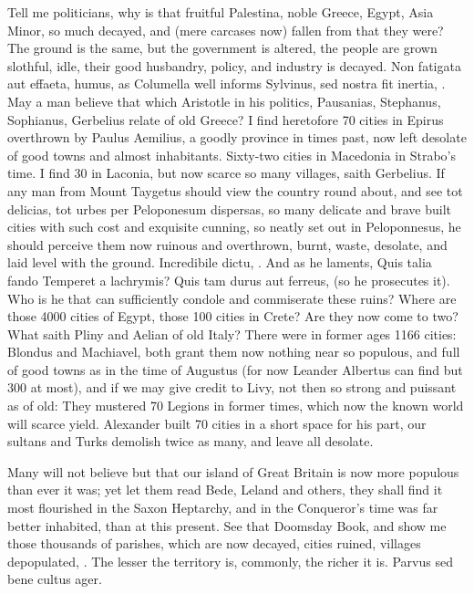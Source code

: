 {Tell me politicians, why is that fruitful Palestina, noble Greece,
Egypt, Asia Minor, so much decayed, and (mere carcases now) fallen from
that they were? The ground is the same, but the government is altered,
the people are grown slothful, idle, their good husbandry, policy, and
industry is decayed. Non fatigata aut effaeta, humus, as Columella
well informs Sylvinus, sed nostra fit inertia, \etc{}. May a man believe
that which Aristotle in his politics, Pausanias, Stephanus, Sophianus,
Gerbelius relate of old Greece? I find heretofore 70 cities in Epirus
overthrown by Paulus Aemilius, a goodly province in times past,
now left desolate of good towns and almost inhabitants. Sixty-two
cities in Macedonia in Strabo's time. I find 30 in Laconia, but now
scarce so many villages, saith Gerbelius. If any man from Mount
Taygetus should view the country round about, and see tot delicias, tot
urbes per Peloponesum dispersas, so many delicate and brave built
cities with such cost and exquisite cunning, so neatly set out in
Peloponnesus, he should perceive them now ruinous and overthrown,
burnt, waste, desolate, and laid level with the ground. Incredibile
dictu, \etc{}. And as he laments, Quis talia fando Temperet a lachrymis?
Quis tam durus aut ferreus, (so he prosecutes it). Who is he that
can sufficiently condole and commiserate these ruins? Where are those
4000 cities of Egypt, those 100 cities in Crete? Are they now come to
two? What saith Pliny and Aelian of old Italy? There were in former
ages 1166 cities: Blondus and Machiavel, both grant them now nothing
near so populous, and full of good towns as in the time of Augustus
(for now Leander Albertus can find but 300 at most), and if we may give
credit to Livy, not then so strong and puissant as of old: They
mustered 70 Legions in former times, which now the known world will
scarce yield. Alexander built 70 cities in a short space for his part,
our sultans and Turks demolish twice as many, and leave all desolate.

Many will not believe but that our island of Great Britain is now more
populous than ever it was; yet let them read Bede, Leland and others,
they shall find it most flourished in the Saxon Heptarchy, and in the
Conqueror's time was far better inhabited, than at this present. See
that Doomsday Book, and show me those thousands of parishes, which are
now decayed, cities ruined, villages depopulated, \etc{}. The lesser the
territory is, commonly, the richer it is. Parvus sed bene cultus ager.

}

